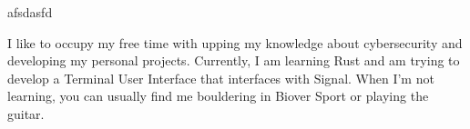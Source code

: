 
\begin{cventries}
  \cventry
	{afsdasfd}
\end{cventries}

I like to occupy my free time with upping my knowledge about cybersecurity and developing my personal projects. Currently, I am learning Rust and am trying to develop a Terminal User Interface that interfaces with Signal. When I'm not learning, you can usually find me bouldering in Biover Sport or playing the guitar.



